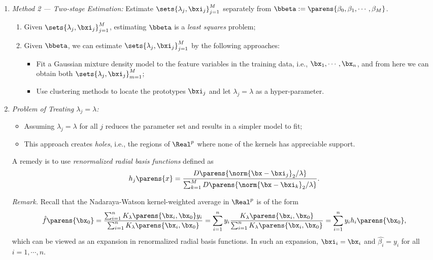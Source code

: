 \documentclass[12pt]{article}
\begin{document}
\begin{enumerate}[label=\textbf{\arabic*.}]
\begin{enumerate}
		\item \textit{Method 2 --- Two-stage Estimation:} Estimate $\sets{ \lambda_j, \bxi_j }_{j=1}^M$ separately from $\bbeta := \parens{\beta_0, \beta_1, \cdots, \beta_M}$. 
		\begin{enumerate}
			\item Given $\sets{ \lambda_j, \bxi_j }_{j=1}^M$, estimating $\bbeta$ is a \textit{least squares} problem; 
			\item Given $\bbeta$, we can estimate $\sets{ \lambda_j, \bxi_j }_{j=1}^M$ by the following approaches: 
			\begin{itemize}
				\item Fit a Gaussian mixture density model to the feature variables in the training data, i.e., $\bx_1, \cdots, \bx_n$, and from here we can obtain both $\sets{ \lambda_j, \bxi_j }_{m=1}^M$; 
				\item Use clustering methods to locate the prototypes $\bxi_j$ and let $\lambda_j = \lambda$ as a hyper-parameter. 
			\end{itemize}
		\end{enumerate}
		
		\item \textit{Problem of Treating $\lambda_j = \lambda$:} 
		\begin{itemize}
			\item Assuming $\lambda_j = \lambda$ for all $j$ reduces the parameter set and results in a simpler model to fit; 
			\item This approach creates \emph{holes}, i.e., the regions of $\Real^p$ where none of the kernels has appreciable support. 
		\end{itemize}
		A remedy is to use \emph{renormalized radial basis functions} defined as 
		\begin{align*}
			h_j \parens{x} = \frac{D \parens{\norm{\bx - \bxi_j}_2/\lambda}}{\sum_{k=1}^M D \parens{\norm{\bx - \bxi_k}_2/\lambda}}. 
		\end{align*}
		
		\textit{Remark.} Recall that the Nadaraya-Watson kernel-weighted average in $\Real^p$ is of the form 
		\begin{align*}
			\hat{f} \parens{\bx_0} = \frac{\sum_{i=1}^n K_\lambda \parens{\bx_i, \bx_0} y_i}{\sum_{i=1}^n K_\lambda \parens{\bx_i, \bx_0}} = \sum_{i=1}^n y_i \frac{K_\lambda \parens{\bx_i, \bx_0}}{\sum_{i=1}^n K_\lambda \parens{\bx_i, \bx_0}} = \sum_{i=1}^n y_i h_i\parens{\bx_0},  
		\end{align*}
		which can be viewed as an expansion in renormalized radial basis functions. In such an expansion, $\bxi_i = \bx_i$ and $\hat{\beta_i} = y_i$ for all $i = 1, \cdots, n$. 
	\end{enumerate}
\end{enumerate}
\end{document}
